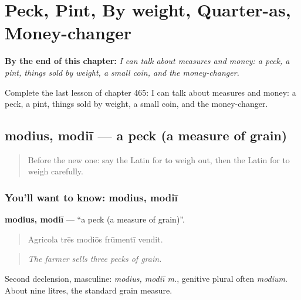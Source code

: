 
\chapter{Peck, Pint, By weight, Quarter-as, Money-changer}
\label{ch:la-peck-pint-by-weight-quarter-as-money-changer}

\begin{chapteropening}
\textbf{By the end of this chapter:} \emph{I can talk about measures and money: a peck, a pint, things sold by weight, a small coin, and the money-changer.}

Complete the last lesson of chapter 465: I can talk about measures and money: a peck, a pint, things sold by weight, a small coin, and the money-changer.
\end{chapteropening}

\section[modius, modiī]{modius, modiī — a peck (a measure of grain)}

\label{lesson:LA-C465-modius}



\begin{quote}
Before the new one: say the Latin for to weigh out, then the Latin for to weigh carefully.
\end{quote}

\subsection*{You'll want to know: modius, modiī}
\textbf{modius, modiī} — \textquotedblleft{}a peck (a measure of grain)\textquotedblright{}.

\begin{quote}
Agricola trēs modiōs frūmentī vendit.
\end{quote}

\begin{quote}
\emph{The farmer sells three pecks of grain.}
\end{quote}

Second declension, masculine: \emph{modius, modiī m.}, genitive plural often \emph{modium}. About nine litres, the standard grain measure.

